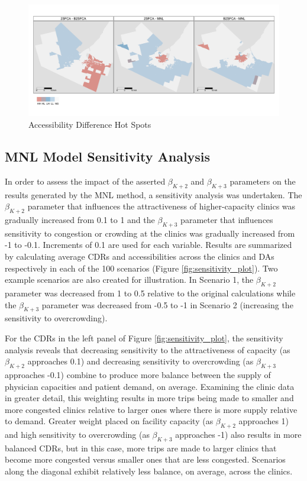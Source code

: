 \documentclass[]{elsarticle} %
\begin{document}
\begin{figure}
\includegraphics[width=1\linewidth]{./img/access_locm_maps} \caption{\label{fig:access_locm_maps}Accessibility Difference Hot Spots}\label{fig:fig 7 access_locm_maps}
\end{figure}

\hypertarget{mnl-model-sensitivity-analysis}{%
\subsection{MNL Model Sensitivity
Analysis}\label{mnl-model-sensitivity-analysis}}

In order to assess the impact of the asserted \(\beta_{K+2}\) and
\(\beta_{K+3}\) parameters on the results generated by the MNL method, a
sensitivity analysis was undertaken. The \(\beta_{K+2}\) parameter that
influences the attractiveness of higher-capacity clinics was gradually
increased from 0.1 to 1 and the \(\beta_{K + 3}\) parameter that
influences sensitivity to congestion or crowding at the clinics was
gradually increased from -1 to -0.1. Increments of 0.1 are used for each
variable. Results are summarized by calculating average CDRs and
accessibilities across the clinics and DAs respectively in each of the
100 scenarios (Figure \ref{fig:sensitivity_plot}). Two example scenarios
are also created for illustration. In Scenario 1, the \(\beta_{K+2}\)
parameter was decreased from 1 to 0.5 relative to the original
calculations while the \(\beta_{K + 3}\) parameter was decreased from
-0.5 to -1 in Scenario 2 (increasing the sensitivity to overcrowding).

For the CDRs in the left panel of Figure \ref{fig:sensitivity_plot}, the
sensitivity analysis reveals that decreasing sensitivity to the
attractiveness of capacity (as \(\beta_{K+2}\) approaches 0.1) and
decreasing sensitivity to overcrowding (as \(\beta_{K+3}\) approaches
-0.1) combine to produce more balance between the supply of physician
capacities and patient demand, on average. Examining the clinic data in
greater detail, this weighting results in more trips being made to
smaller and more congested clinics relative to larger ones where there
is more supply relative to demand. Greater weight placed on facility
capacity (as \(\beta_{K+2}\) approaches 1) and high sensitivity to
overcrowding (as \(\beta_{K+3}\) approaches -1) also results in more
balanced CDRs, but in this case, more trips are made to larger clinics
that become more congested versus smaller ones that are less congested.
Scenarios along the diagonal exhibit relatively less balance, on
average, across the clinics.
\end{document}
